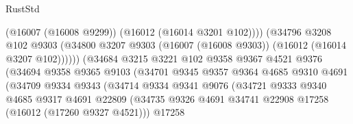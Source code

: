 \begin{lexlean}{RustStd}
\begin{coremodule}
                                          (@16007 (@16008 @9299))
                                          (@16012 (@16014 @3201 @102))))
                                      (@34796
                                        @3208
                                        @102
                                        @9303
                                        (@34800
                                          @3207
                                          @9303
                                          (@16007 (@16008 @9303))
                                          (@16012 (@16014 @3207 @102))))))
                                  (@34684
                                    @3215
                                    @3221
                                    @102
                                    @9358
                                    @9367
                                    @4521
                                    @9376
                                    (@34694
                                      @9358
                                      @9365
                                      @9103
                                      (@34701
                                        @9345
                                        @9357
                                        @9364
                                        @4685
                                        @9310
                                        @4691
                                        (@34709
                                          @9334
                                          @9343
                                          (@34714
                                            @9334
                                            @9341
                                            @9076
                                            (@34721
                                              @9333
                                              @9340
                                              @4685
                                              @9317
                                              @4691
                                              @22809
                                              (@34735
                                                @9326
                                                @4691
                                                @34741
                                                @22908
                                                @17258
                                                (@16012 (@17260 @9327 @4521)))
                                              @17258

\end{coremodule}
\end{lexlean}
